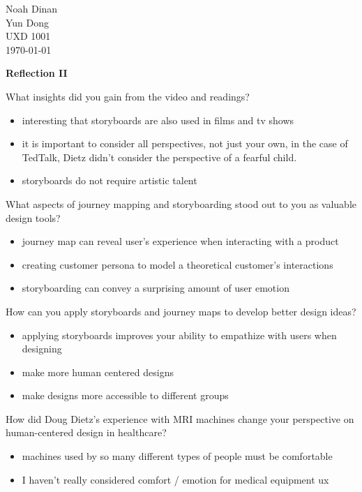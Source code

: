 \documentclass[12pt]{article}
\begin{document}

\newpage
\noindent
Noah Dinan \\ Yun Dong \\ UXD 1001 \\ \today \\

\begin{center}
    \textbf{Reflection II}
\end{center}

\setlength{\parindent}{0in}

What insights did you gain from the video and readings?
\begin{itemize}
    \item interesting that storyboards are also used in films and tv shows
    \item it is important to consider all perspectives, not just your own, in the case of TedTalk,
           Dietz didn't consider the perspective of a fearful child.
    \item storyboards do not require artistic talent
\end{itemize}

What aspects of journey mapping and storyboarding stood out to you as valuable design tools?
\begin{itemize}
    \item journey map can reveal user's experience when interacting with a product
    \item creating customer persona to model a theoretical customer's interactions
    \item storyboarding can convey a surprising amount of user emotion
\end{itemize}

How can you apply storyboards and journey maps to develop better design ideas?
\begin{itemize}
    \item applying storyboards improves your ability to empathize with users when designing
    \item make more human centered designs
    \item make designs more accessible to different groups
\end{itemize}

How did Doug Dietz’s experience with MRI machines change your perspective on human-centered design in healthcare?
\begin{itemize}
    \item machines used by so many different types of people must be comfortable
    \item I haven't really considered comfort / emotion for medical equipment ux
\end{itemize}
\end{document}
